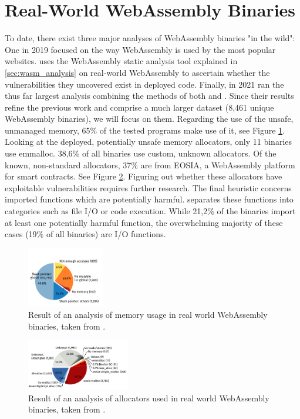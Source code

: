 \documentclass[sigconf]{acmart}
\begin{document}
\section{Real-World WebAssembly Binaries}
To date, there exist three major analyses of WebAssembly binaries "in the wild": One in 2019 \cite{musch_new_2019} focused on the way WebAssembly is used by the most popular websites. \cite{lehmann_everything_2020} uses the WebAssembly static analysis tool explained in \ref{sec:wasm_analysis} on real-world WebAssembly to ascertain whether the vulnerabilities they uncovered exist in deployed code. Finally, in 2021 \cite{hilbig_empirical_2021} ran the thus far largest analysis combining the methods of both \cite{musch_new_2019} and \cite{lehmann_everything_2020}. Since their results refine the previous work and comprise a much larger dataset (8,461 unique WebAssembly binaries), we will focus on them. Regarding the use of the unsafe, unmanaged memory, 65\% of the tested programs make use of it, see Figure \ref{fig:analysis_unmanaged_stack}. Looking at the deployed, potentially unsafe memory allocators, only 11 binaries use emmalloc. 38,6\% of all binaries use custom, unknown allocators. Of the known, non-standard allocators, 37\% are from EOSIA, a WebAssembly platform for smart contracts. See Figure \ref{fig:analysis_used_alloc}. Figuring out whether these allocators have exploitable vulnerabilities requires further research. The final heuristic concerns imported functions which are potentially harmful. \cite{hilbig_empirical_2021} separates these functions into categories such as file I/O or code execution. While 21,2\% of the binaries import at least one potentially harmful function, the overwhelming majority of these cases (19\% of all binaries) are I/O functions. 

\begin{figure}[h]
  \centering
  \includegraphics[width=0.3\textwidth]{analysis_unmanaged_stack}
  \caption{Result of an analysis of memory usage in real world WebAssembly binaries, taken from \cite{hilbig_empirical_2021}.}  
\label{fig:analysis_unmanaged_stack}
\end{figure}

\begin{figure}[h]
  \centering
  \includegraphics[width=0.4\textwidth]{analysis_used_alloc}
  \caption{Result of an analysis of allocators used in real world WebAssembly binaries, taken from \cite{hilbig_empirical_2021}.}  
\label{fig:analysis_used_alloc}
\end{figure}
\end{document}
